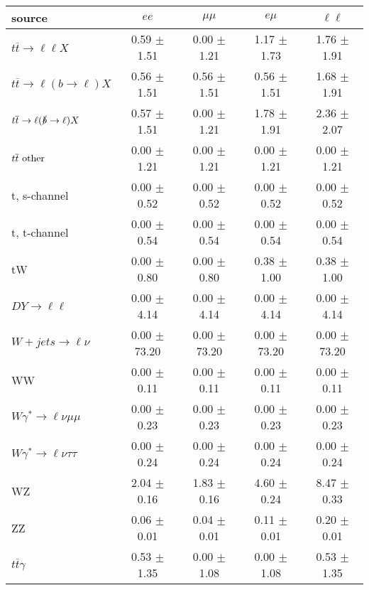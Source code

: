 \begin{tabular}{l|cccc} \hline\hline
source & $ee$ & $\mu\mu$ & $e\mu$ & $\ell\ell $ \\
\hline
$t\overline{t} \rightarrow \ell \ell X$ &  0.59 $\pm$  1.51 &  0.00 $\pm$  1.21 &  1.17 $\pm$  1.73 &  1.76 $\pm$  1.91 \\
$t\overline{t} \rightarrow \ell (b \rightarrow \ell) X$ &  0.56 $\pm$  1.51 &  0.56 $\pm$  1.51 &  0.56 $\pm$  1.51 &  1.68 $\pm$  1.91 \\
$t\overline{t} \rightarrow \ell (\slashed b \rightarrow \ell) X$ &  0.57 $\pm$  1.51 &  0.00 $\pm$  1.21 &  1.78 $\pm$  1.91 &  2.36 $\pm$  2.07 \\
        $t\overline{t}\ \rm{other}$ &  0.00 $\pm$  1.21 &  0.00 $\pm$  1.21 &  0.00 $\pm$  1.21 &  0.00 $\pm$  1.21 \\
\hline
                       t, s-channel &  0.00 $\pm$  0.52 &  0.00 $\pm$  0.52 &  0.00 $\pm$  0.52 &  0.00 $\pm$  0.52 \\
                       t, t-channel &  0.00 $\pm$  0.54 &  0.00 $\pm$  0.54 &  0.00 $\pm$  0.54 &  0.00 $\pm$  0.54 \\
                                 tW &  0.00 $\pm$  0.80 &  0.00 $\pm$  0.80 &  0.38 $\pm$  1.00 &  0.38 $\pm$  1.00 \\
\hline
         $DY \rightarrow \ell \ell$ &  0.00 $\pm$  4.14 &  0.00 $\pm$  4.14 &  0.00 $\pm$  4.14 &  0.00 $\pm$  4.14 \\
      $W+jets \rightarrow \ell \nu$ &  0.00 $\pm$ 73.20 &  0.00 $\pm$ 73.20 &  0.00 $\pm$ 73.20 &  0.00 $\pm$ 73.20 \\
                                 WW &  0.00 $\pm$  0.11 &  0.00 $\pm$  0.11 &  0.00 $\pm$  0.11 &  0.00 $\pm$  0.11 \\
\hline
$W\gamma^{*} \rightarrow \ell \nu \mu\mu$ &  0.00 $\pm$  0.23 &  0.00 $\pm$  0.23 &  0.00 $\pm$  0.23 &  0.00 $\pm$  0.23 \\
$W\gamma^{*} \rightarrow \ell \nu \tau\tau$ &  0.00 $\pm$  0.24 &  0.00 $\pm$  0.24 &  0.00 $\pm$  0.24 &  0.00 $\pm$  0.24 \\
                                 WZ &  2.04 $\pm$  0.16 &  1.83 $\pm$  0.16 &  4.60 $\pm$  0.24 &  8.47 $\pm$  0.33 \\
                                 ZZ &  0.06 $\pm$  0.01 &  0.04 $\pm$  0.01 &  0.11 $\pm$  0.01 &  0.20 $\pm$  0.01 \\
\hline
              $t\overline{t}\gamma$ &  0.53 $\pm$  1.35 &  0.00 $\pm$  1.08 &  0.00 $\pm$  1.08 &  0.53 $\pm$  1.35 \\

\end{tabular}
